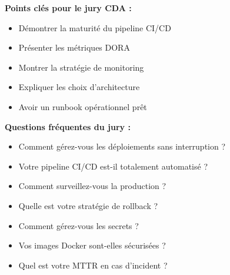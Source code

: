 \begin{conseil}
\textbf{Points clés pour le jury CDA :}
\begin{itemize}
    \item Démontrer la maturité du pipeline CI/CD
    \item Présenter les métriques DORA
    \item Montrer la stratégie de monitoring
    \item Expliquer les choix d'architecture
    \item Avoir un runbook opérationnel prêt
\end{itemize}
\end{conseil}

\begin{jury}
\textbf{Questions fréquentes du jury :}
\begin{itemize}
    \item Comment gérez-vous les déploiements sans interruption ?
    \item Votre pipeline CI/CD est-il totalement automatisé ?
    \item Comment surveillez-vous la production ?
    \item Quelle est votre stratégie de rollback ?
    \item Comment gérez-vous les secrets ?
    \item Vos images Docker sont-elles sécurisées ?
    \item Quel est votre MTTR en cas d'incident ?
\end{itemize}
\end{jury}